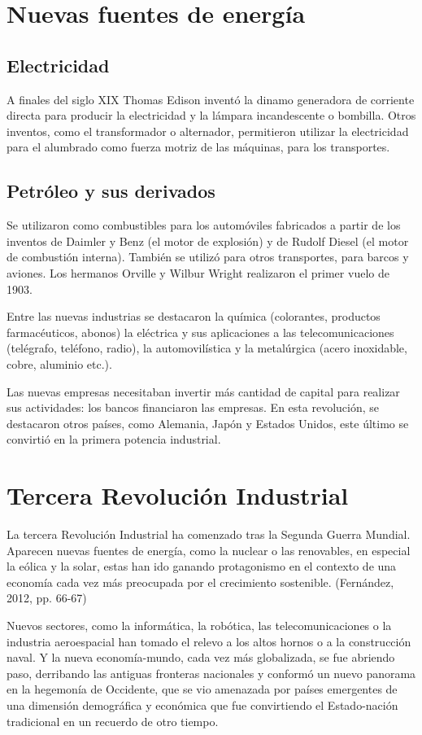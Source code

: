 \documentclass{article}
\begin{document}
  \section*{\large Nuevas fuentes de energía}
  \subsection*{\normalsize Electricidad}
  A finales del siglo XIX Thomas Edison inventó la dinamo generadora de corriente directa para producir la electricidad y la lámpara incandescente o bombilla.
  Otros inventos, como el transformador o alternador, permitieron utilizar la electricidad para el alumbrado como fuerza motriz de las máquinas, para los transportes.

  \subsection*{\normalsize Petróleo y sus derivados}
  Se utilizaron como combustibles para los automóviles fabricados a partir de los inventos de Daimler y Benz (el motor de explosión) y de Rudolf Diesel (el motor de combustión interna). También se utilizó para otros transportes, para barcos y aviones. Los hermanos Orville y Wilbur Wright realizaron el primer vuelo de 1903.

  Entre las nuevas industrias se destacaron la química (colorantes, productos farmacéuticos, abonos) la eléctrica y sus aplicaciones a las telecomunicaciones (telégrafo, teléfono, radio), la automovilística y la metalúrgica (acero inoxidable, cobre, aluminio etc.).

  Las nuevas empresas necesitaban invertir más cantidad de capital para realizar sus actividades: los bancos financiaron las empresas. En esta revolución, se destacaron otros países, como Alemania, Japón y Estados Unidos, este último se convirtió en la primera potencia industrial.


  \section{Tercera Revolución Industrial}
  La tercera Revolución Industrial ha comenzado tras la Segunda Guerra Mundial. Aparecen nuevas fuentes de energía, como la nuclear o las renovables, en especial la eólica y la solar, estas han ido ganando protagonismo en el contexto de una economía cada vez más preocupada por el crecimiento sostenible. (Fernández, 2012, pp. 66-67)

  Nuevos sectores, como la informática, la robótica, las telecomunicaciones o la industria aeroespacial han tomado el relevo a los altos hornos o a la construcción naval. Y la nueva economía-mundo, cada vez más globalizada, se fue abriendo paso, derribando las antiguas fronteras nacionales y conformó un nuevo panorama en la hegemonía de Occidente, que se vio amenazada por países emergentes de una dimensión demográfica y económica que fue convirtiendo el Estado-nación tradicional en un recuerdo de otro tiempo.
\end{document}

